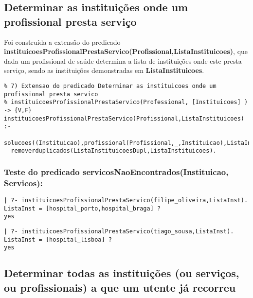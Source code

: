 \documentclass[
  oneside,
  10pt, a4paper,
  footinclude=true,
  headinclude=true,
  cleardoublepage=empty
]{scrbook}
\begin{document}
\subsection{Determinar as instituições onde um profissional presta serviço}







Foi construída a extensão do predicado \textbf{instituicoesProfissionalPrestaServico(Profissional,ListaInstituicoes)}, que dada um profissional de saúde determina a lista de instituições onde este presta serviço, sendo as instituições demonstradas em \textbf{ListaInstituicoes}.\par 
\begin{lstlisting}
% 7) Extensao do predicado Determinar as instituicoes onde um profissional presta servico
% instituicoesProfissionalPrestaServico(Professional, [Instituicoes] ) -> {V,F}
instituicoesProfissionalPrestaServico(Profissional,ListaInstituicoes) :-
  solucoes((Instituicao),profissional(Profissional,_,Instituicao),ListaInstituicoesDupl),
  removerduplicados(ListaInstituicoesDupl,ListaInstituicoes).
\end{lstlisting}


\subsubsection{Teste do predicado \textbf{servicosNaoEncontrados(Instituicao, Servicos)}:}

\begin{lstlisting}
| ?- instituicoesProfissionalPrestaServico(filipe_oliveira,ListaInst).
ListaInst = [hospital_porto,hospital_braga] ? 
yes
\end{lstlisting}

\begin{lstlisting}
| ?- instituicoesProfissionalPrestaServico(tiago_sousa,ListaInst).
ListaInst = [hospital_lisboa] ? 
yes
\end{lstlisting}









\subsection{Determinar todas as instituições (ou serviços, ou profissionais) a que um utente já recorreu}
\end{document}
